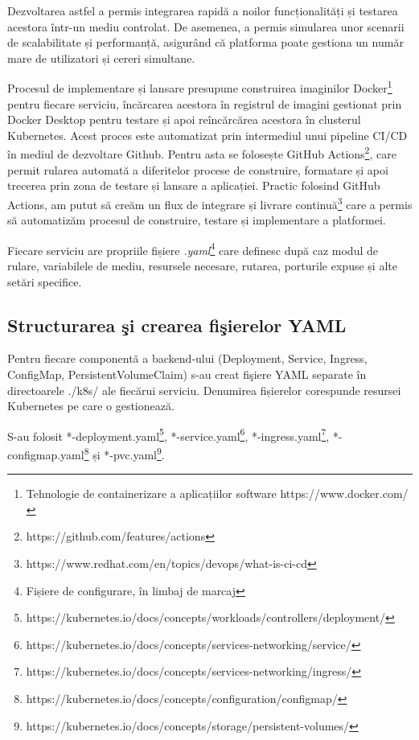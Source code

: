 Dezvoltarea astfel a permis integrarea rapidă a noilor funcționalități și
testarea acestora într-un mediu controlat. De asemenea, a permis simularea unor scenarii de
scalabilitate și performanță, asigurând că platforma poate gestiona un număr mare de
utilizatori și cereri simultane.

Procesul de implementare și lansare presupune construirea imaginilor Docker\footnote{Tehnologie de containerizare
a aplicațiilor software https://www.docker.com/} pentru fiecare
serviciu, încărcarea acestora în registrul de imagini gestionat prin Docker Desktop pentru
testare și apoi reîncărcărea acestora în clusterul Kubernetes. Acest proces este automatizat
prin intermediul unui pipeline CI/CD în mediul de dezvoltare Github. Pentru asta se folosește
GitHub Actions\footnote{https://github.com/features/actions}, care permit rularea automată a diferitelor procese de construire, formatare
și apoi trecerea prin zona de testare și lansare a aplicației.
Practic folosind GitHub Actions, am putut să creăm un flux de integrare și livrare
continuă\footnote{https://www.redhat.com/en/topics/devops/what-is-ci-cd} care a permis să automatizăm
procesul de construire, testare și implementare a platformei.

Fiecare serviciu are propriile fișiere \textit{.yaml}\footnote{Fișiere de configurare, în limbaj de marcaj}
care definesc după caz modul de rulare, variabilele de mediu,
resursele necesare, rutarea, porturile expuse și alte setări specifice.


\subsection{Structurarea şi crearea fişierelor YAML}

Pentru fiecare componentă a backend‐ului (Deployment, Service, 
Ingress, ConfigMap, PersistentVolumeClaim) s-au creat fişiere YAML
separate în directoarele ./k8s/ ale fiecărui serviciu. Denumirea fișierelor corespunde resursei Kubernetes pe care o gestionează.

S-au folosit
*-deployment.yaml\footnote{https://kubernetes.io/docs/concepts/workloads/controllers/deployment/},
*-service.yaml\footnote{https://kubernetes.io/docs/concepts/services-networking/service/},
*-ingress.yaml\footnote{https://kubernetes.io/docs/concepts/services-networking/ingress/},
*-configmap.yaml\footnote{https://kubernetes.io/docs/concepts/configuration/configmap/} și
*-pvc.yaml\footnote{https://kubernetes.io/docs/concepts/storage/persistent-volumes/}.

